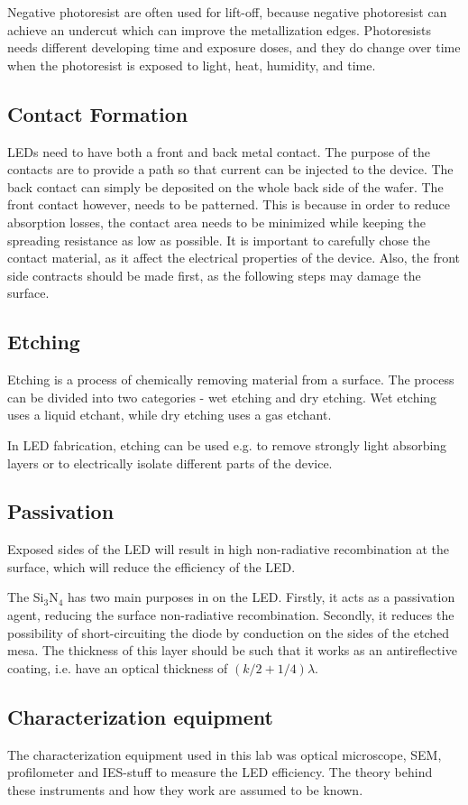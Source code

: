 Negative photoresist are often used for lift-off, because negative photoresist can achieve an undercut which can improve the metallization edges.
Photoresists needs different developing time and exposure doses, and they do change over time when the photoresist is exposed to light, heat, humidity, and time.

\subsection{Contact Formation}

LEDs need to have both a front and back metal contact.
The purpose of the contacts are to provide a path so that  current can be injected to the device. 
The back contact can simply be deposited on the whole back side of the wafer.
The front contact however, needs to be patterned.
This is because in order to reduce absorption losses, the contact area needs to be minimized while keeping the spreading resistance as low as possible.
It is important to carefully chose the contact material, as it affect the electrical properties of the device.
Also, the front side contracts should be made first, as the following steps may damage the surface.

\subsection{Etching}
\label{etching}

Etching is a process of chemically removing material from a surface. 
The process can be divided into two categories -  wet etching and dry etching.
Wet etching uses a liquid etchant, while dry etching uses a gas etchant.

In LED fabrication, etching can be used e.g. to remove strongly light absorbing layers or to electrically isolate different parts of the device.

\subsection{Passivation}

Exposed sides of the LED will result in high non-radiative recombination at the surface, which will reduce the efficiency of the LED.

The Si$_3$N$_4$ has two main purposes in on the LED.
Firstly, it acts as a passivation agent, reducing the surface non-radiative recombination.
Secondly, it reduces the possibility of short-circuiting the diode by conduction on the sides of the etched mesa. 
The thickness of this layer should be such that it works as an antireflective coating, i.e. have an optical thickness of $(k/2 + 1/4)\lambda$.


\subsection{Characterization equipment}
\label{characterization}

The characterization equipment used in this lab was optical microscope, SEM, profilometer and IES-stuff to measure the LED efficiency.
The theory behind these instruments and how they work are assumed to be known.